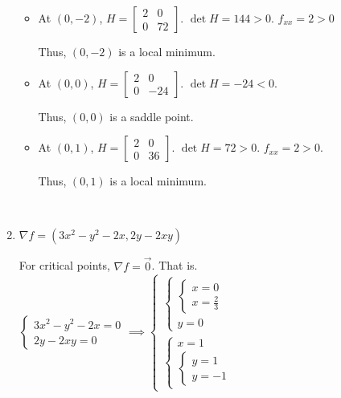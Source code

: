 \documentclass[11pt,fleqn]{book} %
\begin{document}
\begin{enumerate}
    \begin{itemize}
        \item At $(0, -2)$, $H = \begin{bmatrix} 2 & 0 \\ 0 & 72 \end{bmatrix}$. $\det H = 144 > 0$. $f_{xx} = 2 > 0$
        
        Thus, $(0, -2)$ is a local minimum. 

        \item At $(0, 0)$, $H = \begin{bmatrix} 2 & 0 \\ 0 & -24 \end{bmatrix}$. $\det H = -24 < 0$.
        
        Thus, $(0, 0)$ is a saddle point. 

        \item At $(0, 1)$, $H = \begin{bmatrix} 2 & 0 \\ 0 & 36 \end{bmatrix}$. $\det H = 72 > 0$. $f_{xx} = 2 > 0$. 
        
        Thus, $(0, 1)$ is a local minimum. 
    \end{itemize}

    {~~~}
    
    \item $\nabla f = \left( 3x^2 - y^2 - 2x, 2y - 2xy \right)$

    For critical points, $\nabla f = \vec{0}$. That is. $\begin{cases} 3x^2 - y^2 - 2x = 0 \\ 2y - 2xy = 0 \end{cases} \implies \begin{cases} \begin{cases} \begin{cases} x = 0 \\ x = \frac{2}{3} \end{cases} \\ y = 0 \end{cases} \\ \begin{cases} x = 1 \\ \begin{cases} y = 1 \\ y = -1 \end{cases} \end{cases} \end{cases}$


\end{enumerate}
\end{document}
